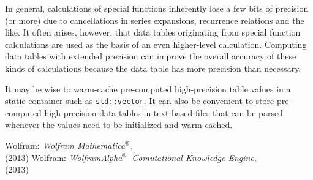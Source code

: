 \documentclass{article}[10pt]
\def\trademarksymbolr   {$^{\text{\rm{\scriptsize{\textregistered}}}}$}
\def\mathematica        {{Mathematica\trademarksymbolr}}
\def\wolframalpha       {{WolframAlpha\trademarksymbolr}}
\begin{document}
In general, calculations of special functions inherently
lose a few bits of precision (or more)
due to cancellations in series expansions,
recurrence relations and the like. It often arises, however,
that data tables originating from
special function calculations are used as the basis
of an even higher-level calculation. Computing data tables
with extended precision can improve the overall accuracy of
these kinds of calculations because the data table
has more precision than necessary.

It may be wise to warm-cache pre-computed high-precision
table values in a static container such as \lstinline|std::vector|.
It can also be convenient to store pre-computed high-precision
data tables in text-based files that can be parsed whenever
the values need to be initialized and warm-cached.

\begin{thebibliography}{9}
Wolfram: {\textit{Wolfram \mathematica}},\\
{} (2013)
Wolfram: {\textit{\wolframalpha\ Comutational Knowledge Engine}},\\
{} (2013)
\end{thebibliography}
\end{document}
